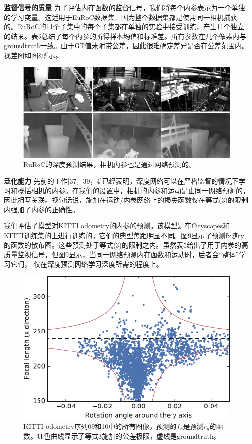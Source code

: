 \documentclass[10pt,journal,compsoc,UTF8]{IEEEtran}
\begin{document}
\textbf{监督信号的质量} 为了评估内在函数的监督信号，我们将每个内参表示为一个单独的学习变量。这适用于EuRoC数据集，因为整个数据集都是使用同一相机捕获的。EuRoC的11个子集中的每个子集都在单独的实验中接受训练，产生11个独立的结果。表5总结了每个内参的所得样本均值和标准差。所有参数在几个像素内与groundtruth一致。由于GT值未附带公差，因此很难确定差异是否在公差范围内。视差图如图8所示。
\begin{figure}[htbp]
  \begin{framed}
     \centering
       \includegraphics[width=1\linewidth]{imgs/8.png} 
     \caption{RuRoC的深度预测结果，相机内参也是通过网络预测的。}
  \end{framed}
\end{figure}

\textbf{泛化能力} 先前的工作[37，39，4]已经表明，深度网络可以在严格监督的情况下学习和概括相机的内参。在我们的设置中，相机的内参和运动是由同一网络预测的，因此相互关联。换句话说，施加在运动/内参网络上的损失函数仅在等式(3)的限制内强加了内参的正确性。

我们评估了模型对KITTI odometry的内参的预测。该模型是在Cityscapes和KITTI训练集的上进行训练的，它们的典型焦距明显不同。图9显示了预测fx随ry的函数的散布图。这些预测处于等式(3)的限制之内。虽然表5给出了用于内参的高质量监视信号，但图9显示，当同一网络预测内在函数和运动时，后者会“整体”学习它们， 仅在深度预测网络学习深度所需的程度上。
\begin{figure}[htbp]
  \begin{framed}
     \centering
       \includegraphics[width=1\linewidth]{imgs/9.png} 
     \caption{KITTI odometry序列09和10中的所有图像，预测的$f_x$是预测$r_y$的函数。红色曲线显示了等式3施加的公差极限，虚线是groundtruth。}
  \end{framed}
\end{figure}
\end{document}
